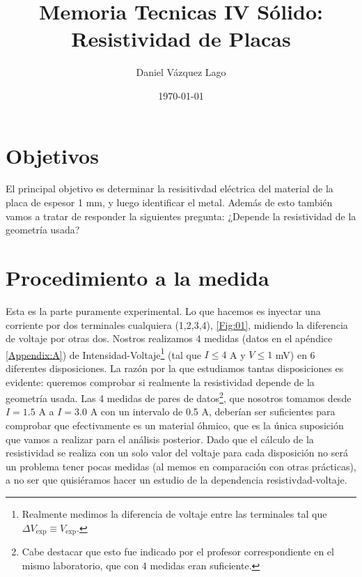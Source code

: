 \documentclass[11pt]{article}
\title{Memoria Tecnicas IV Sólido: Resistividad de Placas}
\author{Daniel Vázquez Lago}
\date{\today}
\begin{document}
\maketitle

\tableofcontents

\setlength{\parskip}{1.8mm}                         %

\newpage

\section{Objetivos} \label{Sec:01}

El principal objetivo es determinar la resisitivdad eléctrica del material de la placa de espesor 1 mm, y luego identificar el metal. Además de esto también vamos a tratar de responder la siguientes pregunta: ¿Depende la resistividad de la geometría usada? 

\section{Procedimiento a la medida}

Esta es la parte puramente experimental. Lo que hacemos es inyectar una corriente por dos terminales cualquiera (1,2,3,4), \cref{Fig:01}, midiendo la diferencia de voltaje por otras dos. Nostros realizamos 4 medidas (datos en el apéndice \ref{Appendix:A}) de Intensidad-Voltaje\footnote{Realmente medimos la diferencia de voltaje entre las terminales tal que $\Delta V_{\exp}\equiv V_{\exp}$.} (tal que $I\leq 4$ A y $V\leq 1$ mV) en 6 diferentes disposiciones. La razón por la que estudiamos tantas disposiciones es evidente: queremos comprobar si realmente la resistividad depende de la geometría usada. Las 4 medidas de pares de datos\footnote{Cabe destacar que esto fue indicado por el profesor correspondiente en el mismo laboratorio, que con 4 medidas eran suficiente.}, que nosotros tomamos desde $I=1.5$ A a $I=3.0$ A con un intervalo de 0.5 A, deberían ser suficientes para comprobar que efectivamente es un material óhmico, que es la única suposición que vamos a realizar para el análisis posterior. Dado que el cálculo de la resistividad se realiza con un solo valor del voltaje para cada disposición no será un problema tener pocas medidas (al memos en comparación con otras prácticas), a no ser que quisiéramos hacer un estudio de la dependencia resistivdad-voltaje.
\end{document}
